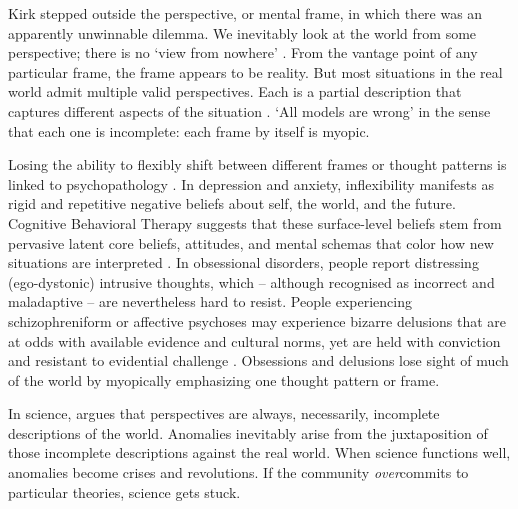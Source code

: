 \documentclass[12pt]{article}
\begin{document}
Kirk stepped outside the perspective, or mental frame, in which there was an apparently unwinnable dilemma. We inevitably look at the world from some perspective; there is no `view from nowhere' \citep{nagel1986view}. From the vantage point of any particular frame, the frame appears to be reality. But most situations in the real world admit multiple valid perspectives. Each is a partial description that captures different aspects of the situation \citep{goffman1974frame, de1970lateral, duncker1945on, ohlsson1992information, lakoff1980metaphors, safo2008strong, javed2024big, popper1934logik, korzybski1933science, wittgenstein1922tractatus, heidegger1998humanism, goodman1978ways, feyerabend1975against, hofstadter2001analogy, wood2012dead, freud1936ich, adorno1950authoritarian}. `All models are wrong' \citep{box1976science} in the sense that each one is incomplete: each frame by itself is myopic.

Losing the ability to flexibly shift between different frames or thought patterns is linked to psychopathology \citep{kashdan2010psychological, reich1933character, shapiro1965neurotic}. In depression and anxiety, inflexibility manifests as rigid and repetitive negative beliefs about self, the world, and the future. Cognitive Behavioral Therapy suggests that these surface-level beliefs stem from pervasive latent core beliefs, attitudes, and mental schemas that color how new situations are interpreted \citep{beck2011cognitive}. In obsessional disorders, people report distressing (ego-dystonic) intrusive thoughts, which -- although recognised as incorrect and maladaptive -- are nevertheless hard to resist. People experiencing schizophreniform or affective psychoses may experience bizarre delusions that are at odds with available evidence and cultural norms, yet are held with conviction and resistant to evidential challenge \citep{mishara2010klaus, jaspers1997general, american2013diagnostic, heinz2019towards, adams2013computational}. Obsessions and delusions lose sight of much of the world by myopically emphasizing one thought pattern or frame.

In science, \cite{kuhn1970structure} argues that perspectives are always, necessarily, incomplete descriptions of the world. Anomalies inevitably arise from the juxtaposition of those incomplete descriptions against the real world. When science functions well, anomalies become crises and revolutions. If the community \textit{over}commits to particular theories, science gets stuck.
\end{document}
